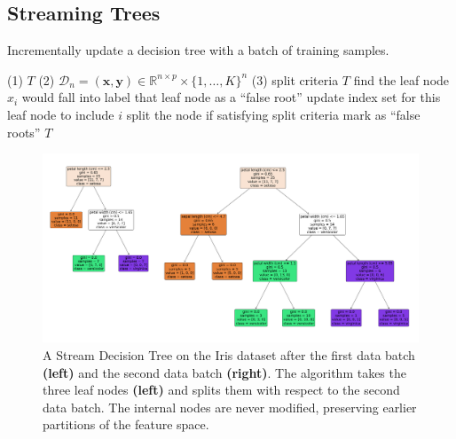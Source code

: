 \subsection{Streaming Trees}
\begin{algorithm}[!htb]
\caption{Incrementally update a decision tree with a batch of training samples.}
\label{alg:sdt}
\begin{algorithmic}[1]
\Require 
\Statex (1) $T$ 
\Statex (2) $\mathcal{D}_n = (\mathbf{x},\mathbf{y}) \in \mathbb{R}^{n \times p} \times \{1,\ldots, K\}^n$ 
\Statex (3) split criteria 
\Ensure
$T$ 
\State find the leaf node $x_i$ would fall into
\State label that leaf node as a ``false root''
\State update index set for this leaf node to include $i$
\EndFor
{}
\State split the node if satisfying split criteria
\State mark as ``false roots''
\EndFor 
\EndFor
\State \Return $T$
\EndFunction 
\end{algorithmic}
\end{algorithm}

\begin{figure}[!htb]
\centering
\includegraphics[width=\textwidth]{iris}
  \caption{A Stream Decision Tree on the Iris dataset after the first data batch \textbf{(left)} and the second data batch \textbf{(right)}. The algorithm takes the three leaf nodes \textbf{(left)} and splits them with respect to the second data batch. The internal nodes are never modified, preserving earlier partitions of the feature space.
  }
\label{fig:iris}
\end{figure}

